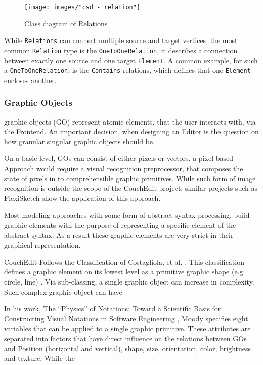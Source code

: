 \begin{figure}[ht]
  \centering
  \texttt{[image: images/"csd - relation"]}
  \caption{Class diagram of Relations}
  \label{fig:relations}
\end{figure}

 While \texttt{Relations} can connect multiple source and target vertices, the most common \texttt{Relation} type is the \texttt{OneToOneRelation}, it describes a connection between exactly one source and one target \texttt{Element}. A common example, for such a \texttt{OneToOneRelation}, is the \texttt{Contains} relations, which defines that one \texttt{Element} encloses another.  


\subsubsection{Graphic Objects}

graphic objects (GO) represent atomic elements, that the user interacts with, via the Frontend. An important decision, when designing an Editor is the question on how granular singular graphic objects should be. 

On a basic level, GOs can consist of either pixels or vectors. a pixel based Approach would require a visual recognition preprocessor, that composes the state of pixels in to comprehensible graphic primitives. While such form of image recognition is outside the scope of the CouchEdit project, similar projects such as FlexiSketch \cite{wuest_flexisketch_2015} show the application of this approach.

Most modeling approaches with some form of abstract syntax processing, build graphic elements with the purpose of representing a specific element of the abstract syntax. As a result these graphic elements are very strict in their graphical representation. 

CouchEdit Follows the Classification of Costagliola, et al. \cite{costagliola_classification_2002}. This classification defines a graphic element on its lowest level as a primitive graphic shape (e.g circle, line) . Via sub-classing, a single graphic object can increase in complexity. Such complex graphic object can have  


In his work, The “Physics” of Notations: Toward a Scientific Basis for Constructing Visual Notations in Software Engineering \cite{moody_physics_2009}, Moody specifies eight variables that can be applied to a single graphic primitive. These attributes are separated into factors that have direct influence on the relations between GOs and   Position
(horizontal and vertical), shape, size, orientation, color, brightness and texture. While the 



